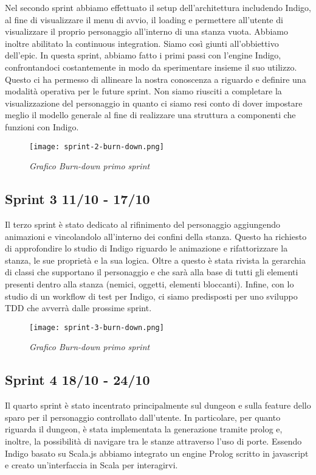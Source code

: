 Nel secondo sprint abbiamo effettuato il setup dell'architettura includendo Indigo, al fine di visualizzare il menu di avvio, il loading e permettere all'utente di visualizzare il proprio personaggio all'interno di una stanza vuota. 
Abbiamo inoltre abilitato la continuous integration. Siamo così giunti all'obbiettivo dell'epic. In questa sprint, abbiamo fatto i primi passi con l'engine Indigo, confrontandoci costantemente in modo da sperimentare insieme il suo utilizzo. Questo ci ha permesso di allineare la nostra conoscenza a riguardo e definire una modalità operativa per le future sprint. 
Non siamo riusciti a completare la visualizzazione del personaggio in quanto ci siamo resi conto di dover impostare meglio il modello generale al fine di realizzare una struttura a componenti che funzioni con Indigo.

\begin{figure}[!hbt]
    \centering
    \texttt{[image: sprint-2-burn-down.png]}
    \caption{\textit{Grafico Burn-down primo sprint}} 
\end{figure}

\subsection{Sprint 3 11/10 - 17/10}

Il terzo sprint è stato dedicato al rifinimento del personaggio aggiungendo animazioni e vincolandolo all'interno dei confini della stanza. 
Questo ha richiesto di approfondire lo studio di Indigo riguardo le animazione e rifattorizzare la stanza, le sue proprietà e la sua logica. 
Oltre a questo è stata rivista la gerarchia di classi che supportano il personaggio e che sarà alla base di tutti gli elementi presenti dentro alla stanza (nemici, oggetti, elementi bloccanti).
Infine, con lo studio di un workflow di test per Indigo, ci siamo predisposti per uno sviluppo TDD che avverrà dalle prossime sprint.


\begin{figure}[!hbt]
    \centering
    \texttt{[image: sprint-3-burn-down.png]}
    \caption{\textit{Grafico Burn-down primo sprint}} 
\end{figure}


\subsection{Sprint 4 18/10 - 24/10}
Il quarto sprint è stato incentrato principalmente sul dungeon e sulla feature dello sparo per il personaggio controllato dall'utente. 
In particolare, per quanto riguarda il dungeon, è stata implementata la generazione tramite prolog e, inoltre, la possibilità di navigare tra le stanze attraverso l'uso di porte. 
Essendo Indigo basato su Scala.js abbiamo integrato un engine Prolog scritto in javascript e creato un'interfaccia in Scala per interagirvi.

